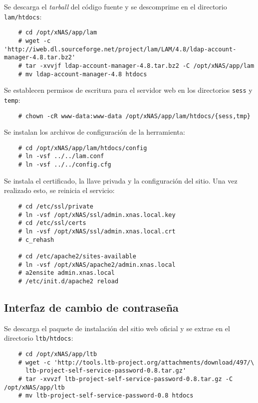 Se descarga el \textit{tarball} del c\'{o}digo fuente y se descomprime en el directorio \texttt{lam/htdocs}:

{
\scriptsize
\linespread{1}
\begin{verbatim}
    # cd /opt/xNAS/app/lam
    # wget -c 'http://iweb.dl.sourceforge.net/project/lam/LAM/4.8/ldap-account-manager-4.8.tar.bz2'
    # tar -xvvjf ldap-account-manager-4.8.tar.bz2 -C /opt/xNAS/app/lam
    # mv ldap-account-manager-4.8 htdocs
\end{verbatim}
}

Se establecen permisos de escritura para el servidor web en los directorios \texttt{sess} y \texttt{temp}:

{
\scriptsize
\linespread{1}
\begin{verbatim}
    # chown -cR www-data:www-data /opt/xNAS/app/lam/htdocs/{sess,tmp}
\end{verbatim}
}

Se instalan los archivos de configuraci\'{o}n de la herramienta:

{
\scriptsize
\linespread{1}
\begin{verbatim}
    # cd /opt/xNAS/app/lam/htdocs/config
    # ln -vsf ../../lam.conf
    # ln -vsf ../../config.cfg
\end{verbatim}
}

Se instala el certificado, la llave privada y la configuraci\'{o}n del sitio. Una vez realizado esto, se reinicia el servicio:

{
\scriptsize
\linespread{1}
\begin{verbatim}
    # cd /etc/ssl/private
    # ln -vsf /opt/xNAS/ssl/admin.xnas.local.key
    # cd /etc/ssl/certs
    # ln -vsf /opt/xNAS/ssl/admin.xnas.local.crt
    # c_rehash

    # cd /etc/apache2/sites-available
    # ln -vsf /opt/xNAS/apache2/admin.xnas.local
    # a2ensite admin.xnas.local
    # /etc/init.d/apache2 reload
\end{verbatim}
}

      \subsection {Interfaz de cambio de contrase\~{n}a}

Se descarga el paquete de instalaci\'{o}n del sitio web oficial y se extrae en el directorio \texttt{ltb/htdocs}:

{
\scriptsize
\linespread{1}
\begin{verbatim}
    # cd /opt/xNAS/app/ltb
    # wget -c 'http://tools.ltb-project.org/attachments/download/497/\
      ltb-project-self-service-password-0.8.tar.gz'
    # tar -xvvzf ltb-project-self-service-password-0.8.tar.gz -C /opt/xNAS/app/ltb
    # mv ltb-project-self-service-password-0.8 htdocs
\end{verbatim}
}


